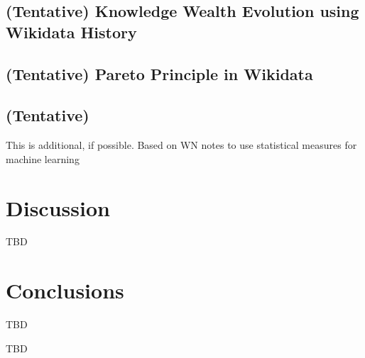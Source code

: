 \documentclass[
]{ceurart}
\begin{document}
\subsection{(Tentative) Knowledge Wealth Evolution using Wikidata History}

\subsection{(Tentative) Pareto Principle in Wikidata}

\subsection{(Tentative)}
This is additional, if possible. Based on WN notes to use statistical measures for machine learning

\section{Discussion}

TBD

\section{Conclusions}

TBD

\begin{acknowledgments}

TBD

\end{acknowledgments}


\end{document}
